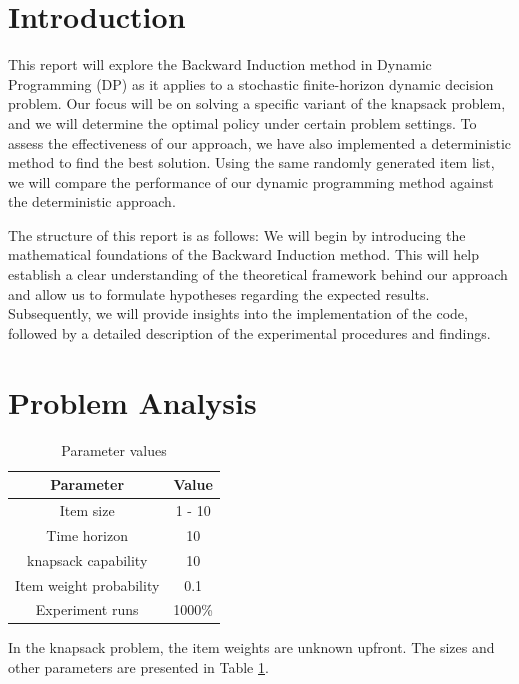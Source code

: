 
\section{Introduction}


This report will explore the Backward Induction method in Dynamic Programming (DP) as it applies to a stochastic finite-horizon dynamic decision problem. Our focus will be on solving a specific variant of the knapsack problem, and we will determine the optimal policy under certain problem settings. To assess the effectiveness of our approach, we have also implemented a deterministic method to find the best solution. Using the same randomly generated item list, we will compare the performance of our dynamic programming method against the deterministic approach.

The structure of this report is as follows: We will begin by introducing the mathematical foundations of the Backward Induction method. This will help establish a clear understanding of the theoretical framework behind our approach and allow us to formulate hypotheses regarding the expected results. Subsequently, we will provide insights into the implementation of the code, followed by a detailed description of the experimental procedures and findings.

\section{Problem Analysis}
\begin{table}
    \centering
    \label{tab:my_label}
    \begin{tabular}{@{}cc@{}}
     \hline %
        Parameter & Value \\ \hline
        Item size & 1 - 10 \\
        Time horizon & 10 \\
        knapsack capability & 10 \\
        Item weight probability & 0.1 \\
        Experiment runs & 1000\% \\\hline
    \end{tabular}
    \caption{Parameter values}
\end{table}
In the knapsack problem, the item weights are unknown upfront. The sizes and other parameters are presented in Table \ref{tab:my_label}.

